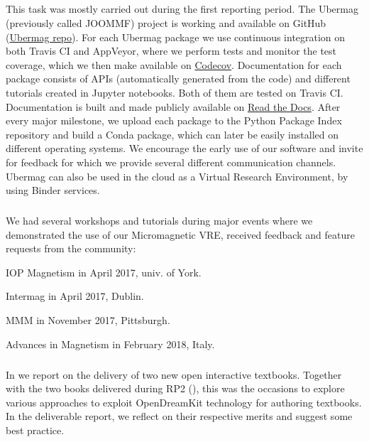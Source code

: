 \smallskip
\subparagraph{}
\label{dissem@dissemination-of-oommf-nb-virtual-environment}

This task was mostly carried out during the first reporting period. The Ubermag
(previously called JOOMMF) project is working and available on GitHub
(\href{https://github.com/ubermag}{Ubermag repo}). For each Ubermag
package we use continuous integration on both Travis CI and AppVeyor,
where we perform tests and monitor the test coverage, which we then
make available on \href{https://codecov.io/}{Codecov}. Documentation
for each package consists of APIs (automatically generated from the
code) and different tutorials created in Jupyter notebooks. Both of
them are tested on Travis CI. Documentation is built and made publicly
available on \href{http://discretisedfield.readthedocs.io}{Read the
  Docs}. After every major milestone, we upload each package to the
Python Package Index repository and build a Conda package, which can
later be easily installed on different operating systems. We encourage
the early use of our software and invite for feedback for which we
provide several different communication channels. Ubermag can also be
used in the cloud as a Virtual Research Environment, by using Binder
services.

\smallskip
\subparagraph{}
\label{dissem@dissemination-of-oommf-nb-workshops}

We had several workshops and tutorials during major events where we demonstrated the use of our Micromagnetic VRE, received feedback and feature requests from the community:

\begin{compactitem}
\item IOP Magnetism in April 2017, univ. of York.
\item Intermag in April 2017, Dublin.
\item MMM in November 2017, Pittsburgh.
\item Advances in Magnetism in February 2018, Italy.
\end{compactitem}

\smallskip
\subparagraph{}
\label{dissem@ibook}

In  we report on the delivery of two new
open interactive textbooks. Together with the two books delivered
during RP2 (), this was the occasions to
explore various approaches to exploit OpenDreamKit technology for
authoring textbooks. In the deliverable report, we reflect on their
respective merits and suggest some best practice.

